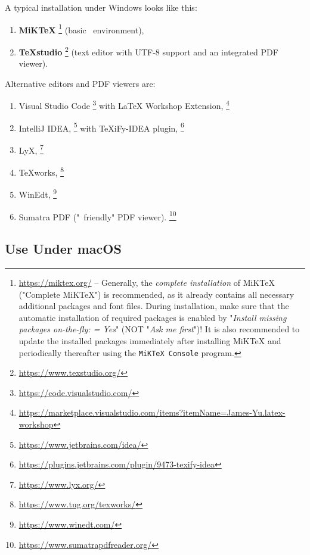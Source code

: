 A typical installation under Windows looks like this:
%
\begin{enumerate}
\item \textbf{MiKTeX}%
	\footnote{\url{https://miktex.org/} -- 
  Generally, the \emph{complete installation} of MiKTeX ("Complete MiKTeX") is 
	recommended, as it already contains all necessary additional packages and font files.
	During installation, make sure that the automatic installation of required packages
	is enabled by "\emph{Install missing packages on-the-fly: = Yes}" 
	(NOT "\emph{Ask me first}")!
	It is also recommended to update the installed packages immediately after installing MiKTeX 
	and periodically thereafter using the \texttt{MiKTeX Console} program.} 
	(basic \latex\ environment),
\item \textbf{TeXstudio}%
	\footnote{\url{https://www.texstudio.org/}}
	(text editor with UTF-8 support and an integrated PDF viewer).
\end{enumerate}
%
Alternative editors and PDF viewers are:
%
\begin{enumerate}
	\item Visual Studio Code%
	\footnote{\url{https://code.visualstudio.com/}}
	with LaTeX Workshop Extension,%
	\footnote{\url{https://marketplace.visualstudio.com/items?itemName=James-Yu.latex-workshop}}
	\item IntelliJ IDEA,%
	\footnote{\url{https://www.jetbrains.com/idea/}}
	with TeXiFy-IDEA plugin,%
	\footnote{\url{https://plugins.jetbrains.com/plugin/9473-texify-idea}}
	\item LyX,%
	\footnote{\url{https://www.lyx.org/}}
	\item TeXworks,%
	\footnote{\url{https://www.tug.org/texworks/}}
	\item WinEdt,%
	\footnote{\url{https://www.winedt.com/}}
	\item Sumatra PDF ("\latex\ friendly" PDF viewer).%
	\footnote{\url{https://www.sumatrapdfreader.org/}}
\end{enumerate}


\subsection{Use Under macOS}

